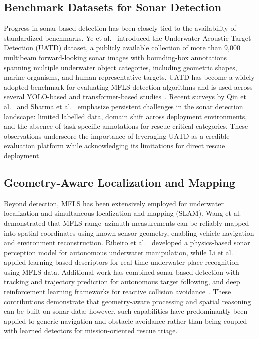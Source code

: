 \documentclass[conference]{IEEEtran}
\begin{document}
\subsection{Benchmark Datasets for Sonar Detection}

Progress in sonar-based detection has been closely tied to the availability of standardized benchmarks. Ye et al.~\cite{ref10} introduced the Underwater Acoustic Target Detection (UATD) dataset, a publicly available collection of more than 9,000 multibeam forward-looking sonar images with bounding-box annotations spanning multiple underwater object categories, including geometric shapes, marine organisms, and human-representative targets. UATD has become a widely adopted benchmark for evaluating MFLS detection algorithms and is used across several YOLO-based and transformer-based studies~\cite{ref12, ref15, ref16}. Recent surveys by Qin et al.~\cite{ref19} and Sharma et al.~\cite{ref20} emphasize persistent challenges in the sonar detection landscape: limited labelled data, domain shift across deployment environments, and the absence of task-specific annotations for rescue-critical categories. These observations underscore the importance of leveraging UATD as a credible evaluation platform while acknowledging its limitations for direct rescue deployment.

\subsection{Geometry-Aware Localization and Mapping}

Beyond detection, MFLS has been extensively employed for underwater localization and simultaneous localization and mapping (SLAM). Wang et al.~\cite{ref3} demonstrated that MFLS range--azimuth measurements can be reliably mapped into spatial coordinates using known sensor geometry, enabling vehicle navigation and environment reconstruction. Ribeiro et al.~\cite{ref5} developed a physics-based sonar perception model for autonomous underwater manipulation, while Li et al.~\cite{ref1} applied learning-based descriptors for real-time underwater place recognition using MFLS data. Additional work has combined sonar-based detection with tracking and trajectory prediction for autonomous target following, and deep reinforcement learning frameworks for reactive collision avoidance~\cite{ref3}. These contributions demonstrate that geometry-aware processing and spatial reasoning can be built on sonar data; however, such capabilities have predominantly been applied to generic navigation and obstacle avoidance rather than being coupled with learned detectors for mission-oriented rescue triage.
\end{document}
